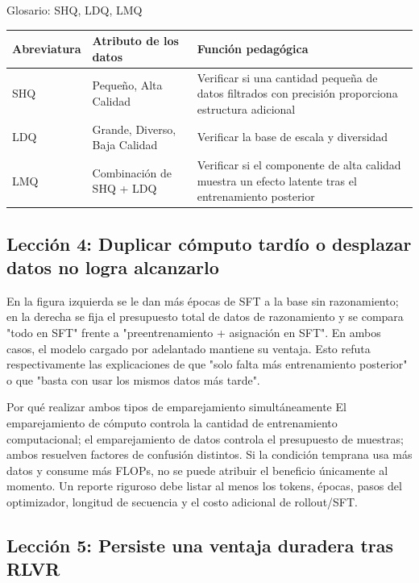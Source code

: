 \begin{knowledgebox}{Glosario: SHQ, LDQ, LMQ}
\begin{tabularx}{\textwidth}{L{0.16\textwidth}L{0.23\textwidth}X}
\toprule
Abreviatura & Atributo de los datos & Función pedagógica \\
\midrule
SHQ & Pequeño, Alta Calidad & Verificar si una cantidad pequeña de datos filtrados con precisión proporciona estructura adicional \\
LDQ & Grande, Diverso, Baja Calidad & Verificar la base de escala y diversidad \\
LMQ & Combinación de SHQ + LDQ & Verificar si el componente de alta calidad muestra un efecto latente tras el entrenamiento posterior \\
\bottomrule
\end{tabularx}
\end{knowledgebox}

\subsection{Lección 4: Duplicar cómputo tardío o desplazar datos no logra alcanzarlo}

En la figura izquierda se le dan más épocas de SFT a la base sin razonamiento; en la derecha se fija el presupuesto total de datos de razonamiento y se compara "todo en SFT" frente a "preentrenamiento + asignación en SFT". En ambos casos, el modelo cargado por adelantado mantiene su ventaja. Esto refuta respectivamente las explicaciones de que "solo falta más entrenamiento posterior" o que "basta con usar los mismos datos más tarde".


\begin{importantbox}{Por qué realizar ambos tipos de emparejamiento simultáneamente}
El emparejamiento de cómputo controla la cantidad de entrenamiento computacional; el emparejamiento de datos controla el presupuesto de muestras; ambos resuelven factores de confusión distintos. Si la condición temprana usa más datos y consume más FLOPs, no se puede atribuir el beneficio únicamente al momento. Un reporte riguroso debe listar al menos los tokens, épocas, pasos del optimizador, longitud de secuencia y el costo adicional de rollout/SFT.
\end{importantbox}

\subsection{Lección 5: Persiste una ventaja duradera tras RLVR}

